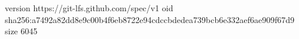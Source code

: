 version https://git-lfs.github.com/spec/v1
oid sha256:a7492a82dd8e9c00b4f6eb8722e94cdccbdedea739bcb6e332aef6ae909f67d9
size 6045
